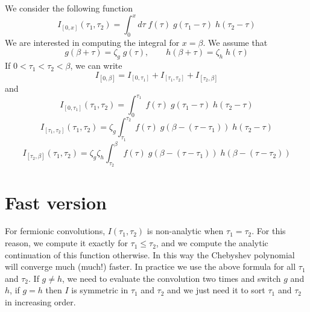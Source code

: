 \documentclass{article}
\begin{document}
We consider the following function
$$
I_{[0,x]}(\tau_1,\tau_2) = \int_0^x d\tau\;f(\tau) \;g(\tau_1-\tau) \;h(\tau_2-\tau)
$$
We are interested in computing the integral for $x=\beta$.
We assume that
$$
g(\beta+\tau) = \zeta_g \;g(\tau),\qquad h(\beta+\tau) = \zeta_h\;h(\tau)
$$
If $0<\tau_1<\tau_2<\beta$, we can write
$$
I_{[0,\beta]}=I_{[0,\tau_1]}+I_{[\tau_1,\tau_2]}+I_{[\tau_2,\beta]}
$$
and
$$
I_{[0,\tau_1]}(\tau_1,\tau_2) = \int_0^{\tau_1}\;f(\tau) \;g(\tau_1-\tau) \;h(\tau_2-\tau)
$$
$$
I_{[\tau_1,\tau_2]}(\tau_1,\tau_2) = \zeta_g\int_{\tau_1}^{\tau_2}\;f(\tau) \;g(\beta-(\tau-\tau_1)) \;h(\tau_2-\tau)
$$
$$
I_{[\tau_2,\beta]}(\tau_1,\tau_2) = \zeta_g\zeta_h\int_{\tau_2}^{\beta}\;f(\tau) \;g(\beta-(\tau-\tau_1)) \;h(\beta-(\tau-\tau_2))
$$
\section{Fast version}
For fermionic convolutions, $I(\tau_1,\tau_2)$ is non-analytic when $\tau_1=\tau_2$. For this reason, we compute it exactly for $\tau_1\le \tau_2$, and we compute the analytic continuation of this function otherwise. In this way the Chebyshev polynomial will converge much (much!) faster. In practice we use the above formula for all $\tau_1$ and $\tau_2$. If $g\neq h$, we need to evaluate the convolution two times and switch $g$ and $h$, if $g=h$ then $I$ is symmetric in $\tau_1$ and $\tau_2$ and we just need it to sort $\tau_1$ and $\tau_2$ in increasing order.
\end{document}
